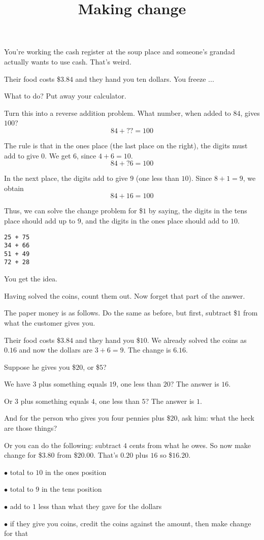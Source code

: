 \documentclass[11pt, oneside]{article}
\title{Making change}
\date{}
\begin{document}
\maketitle
\Large


You're working the cash register at the soup place and someone's grandad actually wants to use cash.  That's weird.

Their food costs \$$3.84$ and they hand you ten dollars.  You freeze ...

What to do?  Put away your calculator.

Turn this into a reverse addition problem.  What number, when added to $84$, gives $100$?
\[ 84 +  \text{??} = 100 \]

The rule is that in the ones place (the last place on the right), the digits must add to give $0$.  We get $6$, since $4 + 6 = 10$.
\[ 84 + \text{?}6 = 100 \]

In the next place, the digits add to give $9$ (one less than $10$).  Since $8 + 1 = 9$, we obtain
\[ 84 + 16 = 100 \]

Thus, we can solve the change problem for \$$1$ by saying, the digits in the tens place should add up to $9$, and the digits in the ones place should add to $10$.

\begin{verbatim}
25 + 75
34 + 66
51 + 49
72 + 28
\end{verbatim}

You get the idea.

Having solved the coins, count them out.  Now forget that part of the answer.

The paper money is as follows.  Do the same as before, but first, subtract \$$1$ from what the customer gives you.

Their food costs \$$3.84$ and they hand you \$$10$.  We already solved the coins as $0.16$ and now the dollars are $3 + 6 = 9$.  The change is $6.16$.

Suppose he gives you \$$20$, or \$$5$?

We have $3$ plus something equals $19$, one less than $20$?  The answer is $16$.

Or $3$ plus something equals $4$, one less than $5$?  The answer is $1$.

And for the person who gives you four pennies plus \$$20$, ask him:  what the heck are those things?

Or you can do the following:  subtract $4$ cents from what he owes.  So now make change for \$$3.80$ from \$$20.00$.  That's $0.20$ plus $16$ so \$$16.20$.

$\bullet$  total to $10$ in the ones position

$\bullet$  total to $9$ in the tens position

$\bullet$ add to $1$ less than what they gave for the dollars

$\bullet$ if they give you coins, credit the coins against the amount, then make change for that
\end{document}
